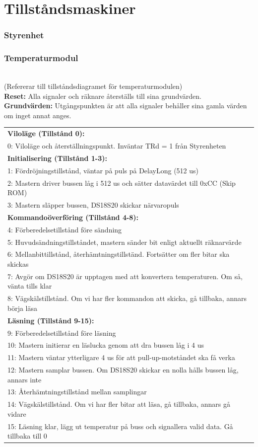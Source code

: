\documentclass[a4paper,11pt]{article}
\begin{document}
\section{Tillståndsmaskiner}
		\subsubsection{Styrenhet}
		\subsubsection{Temperaturmodul}
			\\(Refererar till tillståndsdiagramet för temperaturmodulen)\\
			{\bf Reset:} Alla signaler och räknare återställs till sina grundvärden.\\
			{\bf Grundvärden:} Utgångspunkten är att alla signaler behåller sina gamla värden om inget annat anges.\\
			\begin{tabular}{l}
				\\{\bf Viloläge (Tillstånd 0):}\\
				0: Viloläge och återställningspunkt. Inväntar TRd = 1 från Styrenheten\\
				{\bf Initialisering (Tillstånd 1-3):}\\
				1: Fördröjningstillstånd, väntar på puls på DelayLong (512 us)\\
				2: Mastern driver bussen låg i 512 us och sätter datavärdet till 0xCC (Skip ROM)\\
				3: Mastern släpper bussen, DS18S20 skickar närvaropuls\\
				{\bf Kommandoöverföring (Tillstånd 4-8):}\\
				4: Förberedelsetillstånd före sändning\\
				5: Huvudsändningstillståndet, mastern sänder bit enligt aktuellt räknarvärde\\
				6: Mellanbittillstånd, återhämtningstillständ. Fortsätter om fler bitar ska skickas\\
				7: Avgör om DS18S20 är upptagen med att konvertera temperaturen. Om så, vänta tills klar\\
				8: Vägskälstillstånd. Om vi har fler kommandon att skicka, gå tillbaka, annars börja läsa\\
				{\bf Läsning (Tillstånd 9-15):}\\
				9:  Förberedelsetillstånd före läsning\\
				10: Mastern initierar en läslucka genom att dra bussen låg i 4 us\\
				11: Mastern väntar ytterligare 4 us för att pull-up-motståndet ska få verka\\
				12: Mastern samplar bussen. Om DS18S20 skickar en nolla hålls bussen låg, annars inte\\
				13: Återhämtningstillstånd mellan samplingar\\
				14: Vägskälstillstånd. Om vi har fler bitar att läsa, gå tillbaka, annars gå vidare\\
				15: Läsning klar, lägg ut temperatur på buss och signallera valid data. Gå tillbaka till 0\\
			\end{tabular}
\end{document}
